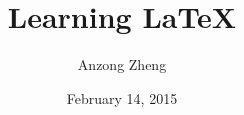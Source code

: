 \documentclass[10pt,a4paper]{book}
\begin{document}
	
\author{Anzong Zheng}
\title{Learning \LaTeX}
\date{February 14, 2015}
\maketitle
\newpage


\tableofcontents
\newpage


\begin{CJK*}{UTF8}{song}

% 

% 
% 
% 
% 
% 
% 
% 
% 
% 
% 
% 
% 
% 
% 
% 

\end{CJK*}

\end{document}
